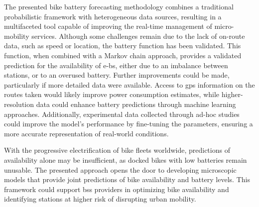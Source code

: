 The presented bike battery forecasting methodology combines a traditional probabilistic framework with heterogeneous data sources, resulting in a multifaceted tool capable of improving the real-time management of micro-mobility services. Although some challenges remain due to the lack of on-route data, such as speed or location, the battery function has been validated. This function, when combined with a Markov chain approach, provides a validated prediction for the availability of \acp{e-b}, either due to an imbalance between stations, or to an overused battery. Further improvements could be made, particularly if more detailed data were available. Access to \ac{gps} information on the routes taken would likely improve power consumption estimates, while higher-resolution data could enhance battery predictions through machine learning approaches. Additionally, experimental data collected through ad-hoc studies could improve the model's performance by fine-tuning the parameters, ensuring a more accurate representation of real-world conditions.

With the progressive electrification of bike fleets worldwide, predictions of availability alone may be insufficient, as docked bikes with low batteries remain unusable. The presented approach opens the door to developing microscopic models that provide joint predictions of bike availability and battery levels. This framework could support \ac{bss} providers in optimizing bike availability and identifying stations at higher risk of disrupting urban mobility.
